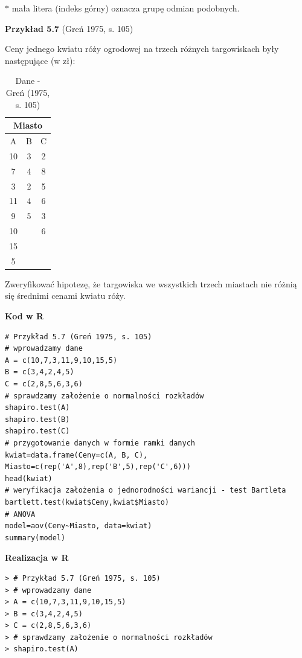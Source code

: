 \documentclass[12pt,B5paper,]{book}
\begin{document}
\(\ast\) mała litera (indeks górny) oznacza grupę odmian podobnych.

\newpage

\textbf{Przykład 5.7} (Greń 1975, s. 105)

Ceny jednego kwiatu róży ogrodowej na trzech różnych targowiskach były
następujące (w zł):

\begin{table}[H]
\centering
\caption{Dane - Greń (1975, s. 105)}
\label{gren105}
\begin{tabular}{ccc}
\hline
\multicolumn{3}{c}{Miasto} \\ \hline
A        & B      & C      \\ \hline
10       & 3      & 2      \\
7        & 4      & 8      \\
3        & 2      & 5      \\
11       & 4      & 6      \\
9        & 5      & 3      \\
10       &       & 6      \\
15       &       &       \\
5        &       &      \\ \hline
\end{tabular}
\end{table}

Zweryfikować hipotezę, że targowiska we wszystkich trzech miastach nie
różnią się średnimi cenami kwiatu róży.

\vspace{0.8cm} \textbf{Kod w R}

\begin{verbatim}
# Przykład 5.7 (Greń 1975, s. 105)
# wprowadzamy dane
A = c(10,7,3,11,9,10,15,5)
B = c(3,4,2,4,5)
C = c(2,8,5,6,3,6)
# sprawdzamy założenie o normalności rozkładów 
shapiro.test(A)
shapiro.test(B)
shapiro.test(C)
# przygotowanie danych w formie ramki danych
kwiat=data.frame(Ceny=c(A, B, C), Miasto=c(rep('A',8),rep('B',5),rep('C',6)))
head(kwiat)
# weryfikacja założenia o jednorodności wariancji - test Bartleta
bartlett.test(kwiat$Ceny,kwiat$Miasto)
# ANOVA
model=aov(Ceny~Miasto, data=kwiat)
summary(model)
\end{verbatim}

\vspace{0.8cm}

\textbf{Realizacja w R}

\begin{verbatim}
> # Przykład 5.7 (Greń 1975, s. 105)
> # wprowadzamy dane
> A = c(10,7,3,11,9,10,15,5)
> B = c(3,4,2,4,5)
> C = c(2,8,5,6,3,6)
> # sprawdzamy założenie o normalności rozkładów 
> shapiro.test(A)
\end{verbatim}
\end{document}

